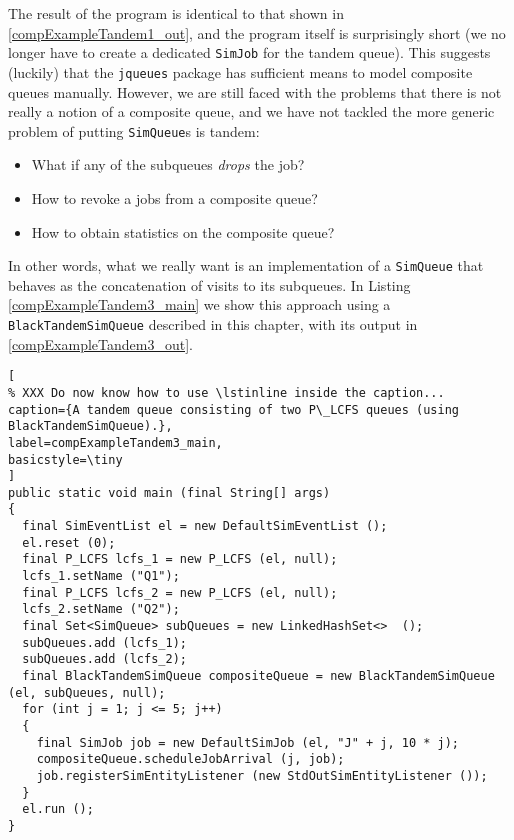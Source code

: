 \documentclass[12pt]{book}
\begin{document}
The result of the program is identical to that shown in \ref{compExampleTandem1_out},
  and the program itself is surprisingly short
  (we no longer have to create a dedicated \lstinline|SimJob| for the tandem queue).
This suggests (luckily) that the \lstinline|jqueues| package has sufficient means to
  model composite queues manually.
However, we are still faced with the problems that there is not really a notion
  of a composite queue, and we have not tackled the more generic problem of
  putting \lstinline|SimQueue|s is tandem:
\begin{itemize}
\item What if any of the subqueues {\em drops} the job?
\item How to revoke a jobs from a composite queue?
\item How to obtain statistics on the composite queue?
\end{itemize}
In other words,
  what we really want is an implementation of a \lstinline|SimQueue|
  that behaves as the concatenation of visits to its subqueues.
In Listing \ref{compExampleTandem3_main} we show this
  approach using a \lstinline|BlackTandemSimQueue|
  described in this chapter,
  with its output in \ref{compExampleTandem3_out}.

\begin{lstlisting}[
% XXX Do now know how to use \lstinline inside the caption...
caption={A tandem queue consisting of two P\_LCFS queues (using BlackTandemSimQueue).},
label=compExampleTandem3_main,
basicstyle=\tiny
]
public static void main (final String[] args)
{    
  final SimEventList el = new DefaultSimEventList ();
  el.reset (0);
  final P_LCFS lcfs_1 = new P_LCFS (el, null);
  lcfs_1.setName ("Q1");
  final P_LCFS lcfs_2 = new P_LCFS (el, null);
  lcfs_2.setName ("Q2");
  final Set<SimQueue> subQueues = new LinkedHashSet<>  ();
  subQueues.add (lcfs_1);
  subQueues.add (lcfs_2);
  final BlackTandemSimQueue compositeQueue = new BlackTandemSimQueue (el, subQueues, null);
  for (int j = 1; j <= 5; j++)
  {
    final SimJob job = new DefaultSimJob (el, "J" + j, 10 * j);
    compositeQueue.scheduleJobArrival (j, job);
    job.registerSimEntityListener (new StdOutSimEntityListener ());
  }
  el.run ();
}
\end{lstlisting}
\end{document}
